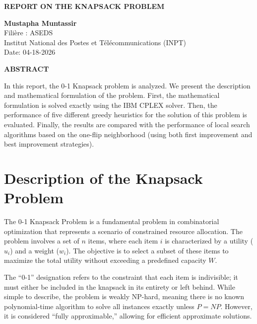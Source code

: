 \documentclass[11pt,a4paper]{article}
\begin{document}
\begin{center}
    \vspace*{1cm}
    {\large \textbf{REPORT ON THE KNAPSACK PROBLEM}} \\
    \vspace{0.8cm}
    
    \textbf{Mustapha Muntassir} \\
    Filière : ASEDS \\
    Institut National des Postes et Télécommunications (INPT) \\
    \vspace{0.2cm}
    Date: 04-18-2026
\end{center}

\vspace{0.8cm}

\noindent \textbf{ABSTRACT}
\vspace{0.2cm}

\noindent In this report, the 0-1 Knapsack problem is analyzed. We present the description and mathematical formulation of the problem. First, the mathematical formulation is solved exactly using the IBM CPLEX solver. Then, the performance of five different greedy heuristics for the solution of this problem is evaluated. Finally, the results are compared with the performance of local search algorithms based on the one-flip neighborhood (using both first improvement and best improvement strategies).
\vspace{0.8cm}

\section{Description of the Knapsack Problem}

The 0-1 Knapsack Problem is a fundamental problem in combinatorial optimization that represents a scenario of constrained resource allocation. The problem involves a set of $n$ items, where each item $i$ is characterized by a utility ($u_i$) and a weight ($w_i$). The objective is to select a subset of these items to maximize the total utility without exceeding a predefined capacity $W$.

The ``0-1'' designation refers to the constraint that each item is indivisible; it must either be included in the knapsack in its entirety or left behind. While simple to describe, the problem is weakly NP-hard, meaning there is no known polynomial-time algorithm to solve all instances exactly unless $P=NP$. However, it is considered ``fully approximable,'' allowing for efficient approximate solutions.
\end{document}
